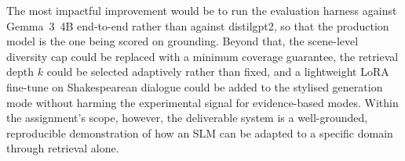\documentclass[10pt,conference]{IEEEtran}
\begin{document}
The most impactful improvement would be to run the evaluation
harness against Gemma~3~4B end-to-end rather than against
distilgpt2, so that the production model is the one being scored
on grounding. Beyond that, the scene-level diversity cap could be
replaced with a minimum coverage guarantee, the retrieval depth $k$
could be selected adaptively rather than fixed, and a lightweight
LoRA fine-tune on Shakespearean dialogue could be added to the
stylised generation mode without harming the experimental signal
for evidence-based modes. Within the assignment's scope, however,
the deliverable system is a well-grounded, reproducible
demonstration of how an SLM can be adapted to a specific domain
through retrieval alone.

\end{document}
